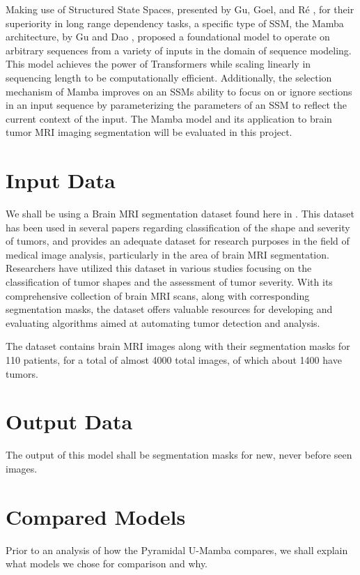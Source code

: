 \documentclass[conference]{IEEEtran}
\begin{document}
Making use of Structured State Spaces, presented by Gu, Goel, and Ré \cite{gu2022efficiently}, for their superiority in long range dependency tasks, a specific type of SSM, the Mamba architecture, by Gu and Dao \cite{gu2023mamba}, proposed a foundational model to operate on arbitrary sequences from a variety of inputs in the domain of sequence modeling. This model achieves the power of Transformers while scaling linearly in sequencing length to be computationally efficient. Additionally, the selection mechanism of Mamba improves on an SSMs ability to focus on or ignore sections in an input sequence by parameterizing the parameters of an SSM to reflect the current context of the input. The Mamba model and its application to brain tumor MRI imaging segmentation will be evaluated in this project.

\section{Input Data}\label{sec2}
We shall be using a Brain MRI segmentation dataset found here in \cite{dataset}. This dataset has been used in several papers regarding classification of the shape and severity of tumors, and provides an adequate dataset for research purposes in the field of medical image analysis, particularly in the area of brain MRI segmentation. Researchers have utilized this dataset in various studies focusing on the classification of tumor shapes and the assessment of tumor severity. With its comprehensive collection of brain MRI scans, along with corresponding segmentation masks, the dataset offers valuable resources for developing and evaluating algorithms aimed at automating tumor detection and analysis.

The dataset contains brain MRI images along with their segmentation masks for 110 patients, for a total of almost 4000 total images, of which about 1400 have tumors.


\section{Output Data}\label{sec3}
The output of this model shall be segmentation masks for new, never before seen images. 

\section{Compared Models}
Prior to an analysis of how the Pyramidal U-Mamba compares, we shall explain what models we chose for comparison and why.
\end{document}
